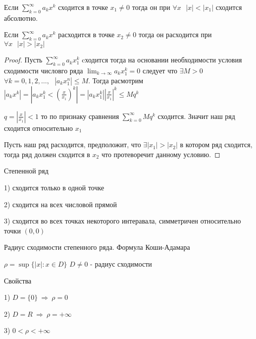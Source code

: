\begin{theorem}[Абеля]
  Если $\sum_{k=0}^{\infty} a_k x^k$ сходится в точке $x_1 \not= 0$ тогда он
  при $\forall x ~~~ |x| < |x_1|$ сходится абсолютно.

  Если $\sum_{k=0}^{\infty} a_k x^k$ расходится в точке $x_2 \not= 0$ тогда он
  расходится при $\forall x ~~~ |x| > |x_2|$
\end{theorem}

\begin{proof}
  Пусть $\sum_{k = 0}^{\infty}a_k x_1^k$ cходится тогда на основании
  необходимости условия сходимости числовго ряда
  $\lim_{k \to \infty} a_k x_1^k = 0$ следует что $\exists M > 0$
  $\forall k = 0, 1,2, \ldots,  ~~~ |a_k x_1^n| \le M$. Тогда
  расмотрим $|a_k x^k| = \left| a_k x_1^k < \left( \frac{x}{x_1} \right)^k
  \right| = |a_k x_1^k| \left| \frac{x}{x_1} \right|^k \le Mq^k$

  $q = \left| \frac{x}{x_1} \right| < 1$ то по признаку сравнения
  $\sum_{k=0}^{\infty} Mq^k$ сходится. Значит наш ряд сходится относительно
  $x_1$

  Пусть наш ряд расходится, предположит, что $\exists |x_1| > |x_2|$ в
  котором ряд сходится, тогда ряд должен сходится в $x_2$ что протеворечит
  данному условию.
\end{proof}

\begin{block}
  Степенной ряд

  1) сходится только в одной точке

  2) сходится на всех числовой прямой

  3) сходится во всех точках некоторого интеравала, симметричен относительно
  точки $(0, 0)$
\end{block}

\begin{title}[\Large]
  Радиус сходимости степенного ряда. Формула Коши-Адамара
\end{title}

\begin{define}
  $\rho = \sup\{ |x| : x \in D \}$ $D \not= 0$ - радиус сходимости

  Свойства

  1) $D = \{0\} ~ \Rightarrow ~ \rho = 0$

  2) $D = R ~ \Rightarrow ~ \rho = +\infty$

  3) $0 < \rho < +\infty$
\end{define}

